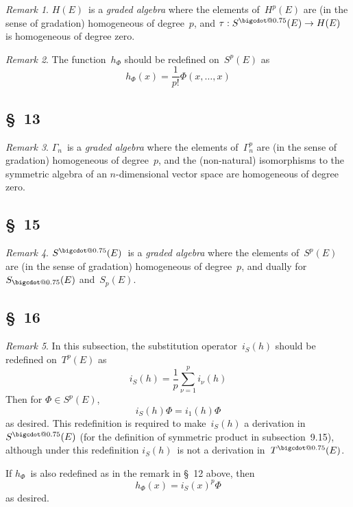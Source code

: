 \documentclass[letterpaper,12pt]{article}
\makeatletter
\newcommand{\bigcdot}[1]{\mathbin{\mathpalette\bigcdot@{#1}}}
\newcommand{\bigcdot@}[2]{%
  \sbox0{$#1\vcenter{}$}%
  \sbox2{$#1\cdot\m@th$}%
  \hbox{%
    \hfil
    \raise\ht0\hbox{%
      \scalebox{#2}{%
        \lower\ht0\hbox{$#1\bullet\m@th$}%
      }%
    }%
    \hfil
  }%
}
\newcommand{\tdot}{\bigcdot{0.75}}
\newcommand{\adot}{\bigcdot{0.75}}
\newcommand{\sdot}{\bigcdot{0.75}}
\theoremstyle{definition}
\theoremstyle{remark}
\newtheorem*{rmk}{Remark}
\makeatother
\begin{document}
\begin{rmk}
\(H(E)\)~is a \emph{graded algebra} where the elements of~\(H^p(E)\) are (in the sense of gradation) homogeneous of degree~\(p\), and \(\tau:S^{\sdot}(E)\to H(E)\) is homogeneous of degree zero.
\end{rmk}

\begin{rmk}
The function~\(h_{\Phi}\) should be redefined on~\(S^p(E)\) as
\[h_{\Phi}(x)=\frac{1}{p!}\Phi(x,\ldots,x)\]
\end{rmk}

\subsection*{\S~13}
\begin{rmk}
\(\Gamma_n\)~is a \emph{graded algebra} where the elements of~\(\Gamma_n^p\) are (in the sense of gradation) homogeneous of degree~\(p\), and the (non-natural) isomorphisms to the symmetric algebra of an \(n\)-dimensional vector space are homogeneous of degree zero.
\end{rmk}

\subsection*{\S~15}
\begin{rmk}
\(S^{\sdot}(E)\)~is a \emph{graded algebra} where the elements of~\(S^p(E)\) are (in the sense of gradation) homogeneous of degree~\(p\), and dually for \(S_{\sdot}(E)\) and~\(S_p(E)\).
\end{rmk}

\subsection*{\S~16}
\begin{rmk}
In this subsection, the substitution operator~\(i_S(h)\) should be redefined on~\(T^p(E)\) as
\[i_S(h)=\frac{1}{p}\sum_{\nu=1}^p i_{\nu}(h)\]
Then for \(\Phi\in S^p(E)\),
\[i_S(h)\Phi=i_1(h)\Phi\]
as desired. This redefinition is required to make~\(i_S(h)\) a derivation in~\(S^{\adot}(E)\) (for the definition of symmetric product in subsection~9.15), although under this redefinition \(i_S(h)\)~is not a derivation in~\(T^{\tdot}(E)\).

If \(h_{\Phi}\)~is also redefined as in the remark in \S~12 above, then
\[h_{\Phi}(x)=i_S(x)^p\Phi\]
as desired.
\end{rmk}
\end{document}
